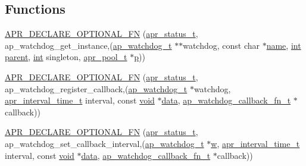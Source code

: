 \subsection*{Functions}
\begin{DoxyCompactItemize}
\item 
\hyperlink{group__MOD__WATCHDOG_gae9d2f5993980bd3063958f89bbe18aa1}{A\+P\+R\+\_\+\+D\+E\+C\+L\+A\+R\+E\+\_\+\+O\+P\+T\+I\+O\+N\+A\+L\+\_\+\+FN} (\hyperlink{group__apr__errno_gaa5105fa83cc322f09382292db8b47593}{apr\+\_\+status\+\_\+t}, ap\+\_\+watchdog\+\_\+get\+\_\+instance,(\hyperlink{structap__watchdog__t}{ap\+\_\+watchdog\+\_\+t} $\ast$$\ast$watchdog, const char $\ast$\hyperlink{pcre_8txt_a5a15d68aadb41c771fe50a27c400d49b}{name}, \hyperlink{pcre_8txt_a42dfa4ff673c82d8efe7144098fbc198}{int} \hyperlink{group__apr__pools_ga3eb8c52002440da9a3eed11d54d08dd5}{parent}, \hyperlink{pcre_8txt_a42dfa4ff673c82d8efe7144098fbc198}{int} singleton, \hyperlink{structapr__pool__t}{apr\+\_\+pool\+\_\+t} $\ast$\hyperlink{group__APACHE__CORE__MPM_ga5cd91701e5c167f2b1a38e70ab57817e}{p}))
\item 
\hyperlink{group__MOD__WATCHDOG_ga1cf4def04a95f6b9cbcd00f5464648da}{A\+P\+R\+\_\+\+D\+E\+C\+L\+A\+R\+E\+\_\+\+O\+P\+T\+I\+O\+N\+A\+L\+\_\+\+FN} (\hyperlink{group__apr__errno_gaa5105fa83cc322f09382292db8b47593}{apr\+\_\+status\+\_\+t}, ap\+\_\+watchdog\+\_\+register\+\_\+callback,(\hyperlink{structap__watchdog__t}{ap\+\_\+watchdog\+\_\+t} $\ast$watchdog, \hyperlink{group__apr__time_gaae2129185a395cc393f76fabf4f43e47}{apr\+\_\+interval\+\_\+time\+\_\+t} interval, const \hyperlink{group__MOD__ISAPI_gacd6cdbf73df3d9eed42fa493d9b621a6}{void} $\ast$\hyperlink{structdata}{data}, \hyperlink{group__MOD__WATCHDOG_gaf35a15ca6cadfcd5df128e79cb51c115}{ap\+\_\+watchdog\+\_\+callback\+\_\+fn\+\_\+t} $\ast$callback))
\item 
\hyperlink{group__MOD__WATCHDOG_gab104bb1a54c8b4e600c64e129d1d3ccd}{A\+P\+R\+\_\+\+D\+E\+C\+L\+A\+R\+E\+\_\+\+O\+P\+T\+I\+O\+N\+A\+L\+\_\+\+FN} (\hyperlink{group__apr__errno_gaa5105fa83cc322f09382292db8b47593}{apr\+\_\+status\+\_\+t}, ap\+\_\+watchdog\+\_\+set\+\_\+callback\+\_\+interval,(\hyperlink{structap__watchdog__t}{ap\+\_\+watchdog\+\_\+t} $\ast$\hyperlink{pcregrep_8txt_ab9a0c51666082a4ca5dd995ee972f77e}{w}, \hyperlink{group__apr__time_gaae2129185a395cc393f76fabf4f43e47}{apr\+\_\+interval\+\_\+time\+\_\+t} interval, const \hyperlink{group__MOD__ISAPI_gacd6cdbf73df3d9eed42fa493d9b621a6}{void} $\ast$\hyperlink{structdata}{data}, \hyperlink{group__MOD__WATCHDOG_gaf35a15ca6cadfcd5df128e79cb51c115}{ap\+\_\+watchdog\+\_\+callback\+\_\+fn\+\_\+t} $\ast$callback))
$$
\end{DoxyCompactItemize}
